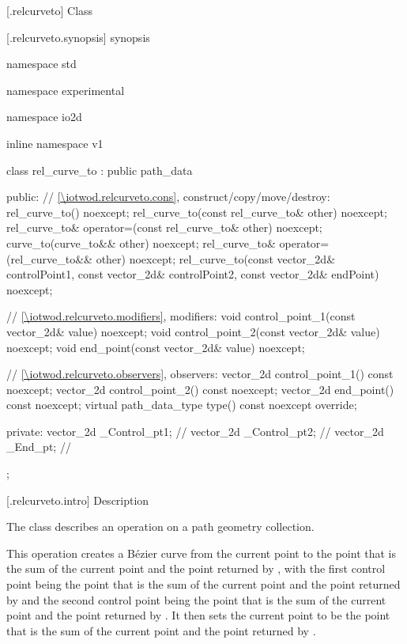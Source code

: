  [\iotwod.relcurveto] {Class }

 [\iotwod.relcurveto.synopsis] { synopsis}

\begin{codeblock}
namespace std { namespace experimental { namespace io2d { inline namespace v1 {
  class rel_curve_to : public path_data {
  public:
    // \ref{\iotwod.relcurveto.cons}, construct/copy/move/destroy:
    rel_curve_to() noexcept;
    rel_curve_to(const rel_curve_to& other) noexcept;
    rel_curve_to& operator=(const rel_curve_to& other) noexcept;
    curve_to(curve_to&& other) noexcept;
    rel_curve_to& operator=(rel_curve_to&& other) noexcept;
    rel_curve_to(const vector_2d& controlPoint1, const vector_2d& controlPoint2,
      const vector_2d& endPoint) noexcept;

    // \ref{\iotwod.relcurveto.modifiers}, modifiers:
    void control_point_1(const vector_2d& value) noexcept;
    void control_point_2(const vector_2d& value) noexcept;
    void end_point(const vector_2d& value) noexcept;


    // \ref{\iotwod.relcurveto.observers}, observers:
    vector_2d control_point_1() const noexcept;
    vector_2d control_point_2() const noexcept;
    vector_2d end_point() const noexcept;
    virtual path_data_type type() const noexcept override;
    
  private:
    vector_2d _Control_pt1; // \expos
    vector_2d _Control_pt2; // \expos
    vector_2d _End_pt;      // \expos
  };
} } } }
\end{codeblock}

 [\iotwod.relcurveto.intro] { Description}

\pnum
{}
The class  describes an operation on a path geometry collection.

\pnum
This operation creates a B\'ezier curve from the current point to the point that is the sum of the current point and the point returned by , with the first control point being the point that is the sum of the current point and the point returned by  and the second control point being the point that is the sum of the current point and the point returned by . It then sets the current point to be the point that is the sum of the current point and the point returned by .


